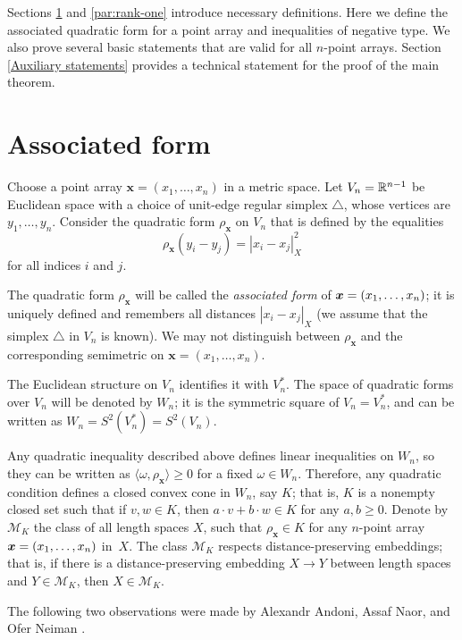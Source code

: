 \documentclass[a4paper,10pt]{article}
\begin{document}
Sections \ref{Associated form} and \ref{par:rank-one} introduce necessary definitions.
Here we define the associated quadratic form for a point array and inequalities of negative type.
We also prove several basic statements that are valid for all $n$-point arrays.
Section \ref{Auxiliary statements} provides a technical statement for the proof of the main theorem.

\section{Associated form}\label{Associated form}

Choose a point array $\bm{x}=(x_1,\dots,x_n)$ in a metric space.
Let $V_n\z=\RR^{n-1}$ be Euclidean space with a choice of unit-edge regular simplex $\triangle$, whose vertices are $y_1,\dots,y_n$.
Consider the quadratic form $\rho_{\bm{x}}$ on $V_n$ that is defined by the equalities
\[\rho_{\bm{x}}(y_i-y_j)=|x_i-x_j|^2_X\]
for all indices $i$ and $j$.

The quadratic form $\rho_{\bm{x}}$ will be called the \emph{associated form} of $\bm{x}=(x_1,\z\dots,x_n)$;
it is uniquely defined and remembers all distances $|x_i-x_j|_X$
(we assume that the simplex $\triangle$ in $V_n$ is known).
We may not distinguish between $\rho_{\bm{x}}$ and the corresponding semimetric on $\bm{x}=(x_1,\dots,x_n)$.

The Euclidean structure on $V_n$ identifies it with $V_n^*$.
The space of quadratic forms over $V_n$ will be denoted by $W_n$;
it is the symmetric square of $V_n=V_n^*$, and can be written as $W_n=S^2(V_n^*)=S^2(V_n)$.

Any quadratic inequality described above defines linear inequalities on $W_n$, so they can be written as $\langle\omega,\rho_{\bm{x}}\rangle\ge 0$ for a fixed $\omega\in W_n$.
Therefore, any quadratic  condition defines a closed convex cone in $W_n$, say $K$;
that is, $K$ is a nonempty closed set such that if $v,w\in K$, then $a\cdot v+b\cdot w\in K$ for any $a,b\ge0$.
Denote by $\mathcal{M}_K$ the class of all length spaces $X$, such that
$\rho_{\bm{x}}\in K$ for any $n$-point array $\bm{x}\z=(x_1,\dots,x_n)$ in~$X$.
The class $\mathcal{M}_K$ respects distance-preserving embeddings; that is,
if there is a distance-preserving embedding $X\to Y$ between length spaces and $Y \in  \mathcal{M}_K$, then $X\in \mathcal{M}_K$.

The following two observations were made by Alexandr Andoni, Assaf Naor, and Ofer Neiman \cite[1.4.1]{ANN}.
\end{document}

